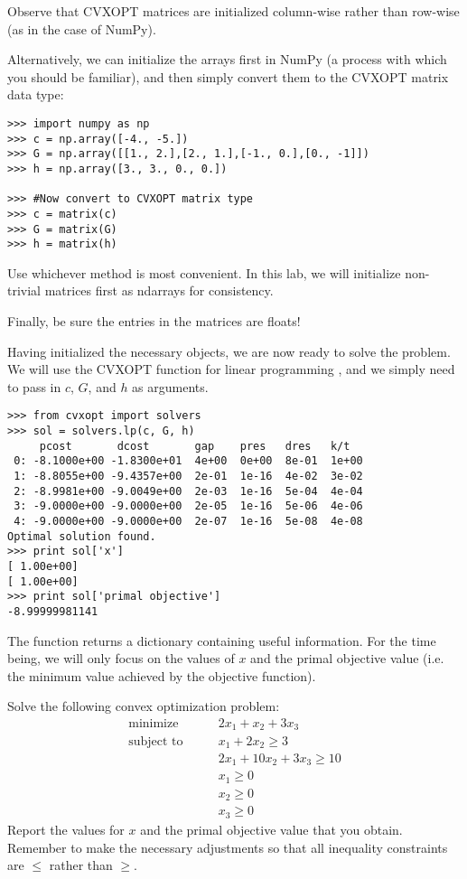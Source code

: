 \begin{warn}
Observe that CVXOPT matrices are initialized column-wise rather than row-wise (as in the case of NumPy).

Alternatively, we can initialize the arrays first in NumPy (a process with which you should be familiar),
and then simply convert them to the CVXOPT matrix data type:
\begin{lstlisting}
>>> import numpy as np
>>> c = np.array([-4., -5.])
>>> G = np.array([[1., 2.],[2., 1.],[-1., 0.],[0., -1]])
>>> h = np.array([3., 3., 0., 0.])

>>> #Now convert to CVXOPT matrix type
>>> c = matrix(c)
>>> G = matrix(G)
>>> h = matrix(h)
\end{lstlisting}
Use whichever method is most convenient. 
In this lab, we will initialize non-trivial matrices first as ndarrays for consistency.

Finally, be sure the entries in the matrices are floats!
\end{warn}

Having initialized the necessary objects, we are now ready to solve the problem.
We will use the CVXOPT function for linear programming , and we simply need to pass in $c$, $G$, and $h$ as arguments.
\begin{lstlisting}
>>> from cvxopt import solvers
>>> sol = solvers.lp(c, G, h)
     pcost       dcost       gap    pres   dres   k/t
 0: -8.1000e+00 -1.8300e+01  4e+00  0e+00  8e-01  1e+00
 1: -8.8055e+00 -9.4357e+00  2e-01  1e-16  4e-02  3e-02
 2: -8.9981e+00 -9.0049e+00  2e-03  1e-16  5e-04  4e-04
 3: -9.0000e+00 -9.0000e+00  2e-05  1e-16  5e-06  4e-06
 4: -9.0000e+00 -9.0000e+00  2e-07  1e-16  5e-08  4e-08
Optimal solution found.
>>> print sol['x']
[ 1.00e+00]
[ 1.00e+00]
>>> print sol['primal objective']
-8.99999981141
\end{lstlisting}
The function  returns a dictionary containing useful information.
For the time being, we will only focus on the values of $x$ and the primal objective value (i.e. the minimum value achieved by
the objective function).
\begin{problem}
Solve the following convex optimization problem:
\begin{align*}
\text{minimize}\qquad &2x_1+x_2+3x_3 \\
\text{subject to}\qquad &x_1+2x_2 \geq 3 \\
	        &2x_1+10x_2+3x_3 \geq 10 \\
		&x_1 \geq 0 \\
		&x_2 \geq 0 \\
		&x_3 \geq 0
\end{align*}
Report the values for $x$ and the primal objective value that you obtain.
Remember to make the necessary adjustments so that all inequality constraints are $\leq$ rather than $\geq$.
\end{problem}

